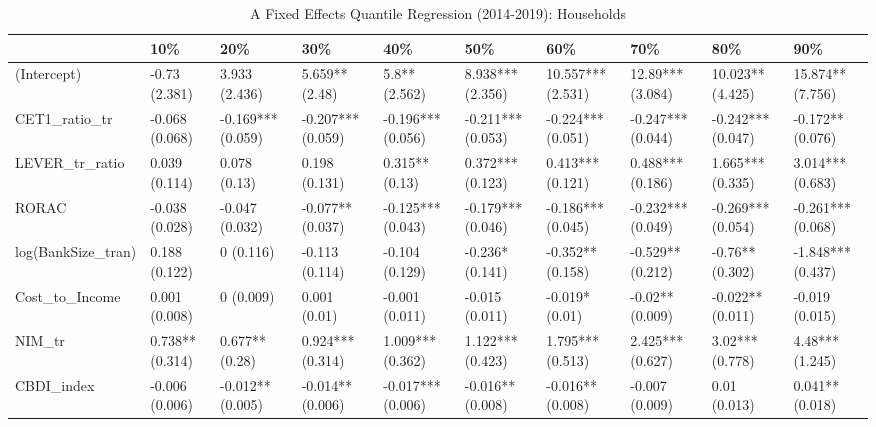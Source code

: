 \begin{table}[ht]
\centering
\caption{A Fixed Effects Quantile Regression (2014-2019): Households} 
\begingroup\small
\begin{tabular}{llllllllll}
  \toprule
 & 10\% & 20\% & 30\% & 40\% & 50\% & 60\% & 70\% & 80\% & 90\% \\ 
  \midrule
(Intercept) & -0.73 (2.381) & 3.933 (2.436) & 5.659** (2.48) & 5.8** (2.562) & 8.938*** (2.356) & 10.557*** (2.531) & 12.89*** (3.084) & 10.023** (4.425) & 15.874** (7.756) \\ 
  CET1\_ratio\_tr & -0.068 (0.068) & -0.169*** (0.059) & -0.207*** (0.059) & -0.196*** (0.056) & -0.211*** (0.053) & -0.224*** (0.051) & -0.247*** (0.044) & -0.242*** (0.047) & -0.172** (0.076) \\ 
  LEVER\_tr\_ratio & 0.039 (0.114) & 0.078 (0.13) & 0.198 (0.131) & 0.315** (0.13) & 0.372*** (0.123) & 0.413*** (0.121) & 0.488*** (0.186) & 1.665*** (0.335) & 3.014*** (0.683) \\ 
  RORAC & -0.038 (0.028) & -0.047 (0.032) & -0.077** (0.037) & -0.125*** (0.043) & -0.179*** (0.046) & -0.186*** (0.045) & -0.232*** (0.049) & -0.269*** (0.054) & -0.261*** (0.068) \\ 
  log(BankSize\_tran) & 0.188 (0.122) & 0 (0.116) & -0.113 (0.114) & -0.104 (0.129) & -0.236* (0.141) & -0.352** (0.158) & -0.529** (0.212) & -0.76** (0.302) & -1.848*** (0.437) \\ 
  Cost\_to\_Income & 0.001 (0.008) & 0 (0.009) & 0.001 (0.01) & -0.001 (0.011) & -0.015 (0.011) & -0.019* (0.01) & -0.02** (0.009) & -0.022** (0.011) & -0.019 (0.015) \\ 
  NIM\_tr & 0.738** (0.314) & 0.677** (0.28) & 0.924*** (0.314) & 1.009*** (0.362) & 1.122*** (0.423) & 1.795*** (0.513) & 2.425*** (0.627) & 3.02*** (0.778) & 4.48*** (1.245) \\ 
  CBDI\_index & -0.006 (0.006) & -0.012** (0.005) & -0.014** (0.006) & -0.017*** (0.006) & -0.016** (0.008) & -0.016** (0.008) & -0.007 (0.009) & 0.01 (0.013) & 0.041** (0.018) \\ 
   \bottomrule
\end{tabular}
\endgroup
\end{table}
